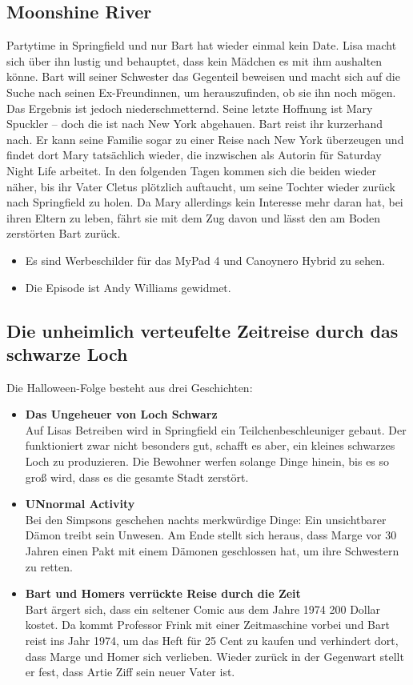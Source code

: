 \subsection{Moonshine River}
Partytime in Springfield und nur Bart hat wieder einmal kein Date. Lisa macht sich über ihn lustig und behauptet, dass kein Mädchen es mit ihm aushalten könne. Bart will seiner Schwester das Gegenteil beweisen und macht sich auf die Suche nach seinen Ex-Freundinnen, um herauszufinden, ob sie ihn noch mögen. Das Ergebnis ist jedoch niederschmetternd. Seine letzte Hoffnung ist Mary Spuckler -- doch die ist nach New York abgehauen. Bart reist ihr kurzerhand nach.  Er kann seine Familie sogar zu einer Reise nach New York überzeugen und findet dort Mary tatsächlich wieder, die inzwischen als Autorin für Saturday Night Life arbeitet. In den folgenden Tagen kommen sich die beiden wieder näher, bis ihr Vater Cletus plötzlich auftaucht, um seine Tochter wieder zurück nach Springfield zu holen. Da Mary allerdings kein Interesse mehr daran hat, bei ihren Eltern zu leben, fährt sie mit dem Zug davon und lässt den am Boden zerstörten Bart zurück.

\begin{itemize}
  \item Es sind Werbeschilder für das MyPad 4 und Canoynero Hybrid zu sehen.
	\item Die Episode ist Andy Williams gewidmet.
\end{itemize}

\subsection{Die unheimlich verteufelte Zeitreise durch das schwarze Loch}
Die Halloween-Folge besteht aus drei Geschichten:
\begin{itemize}
	\item \textbf{Das Ungeheuer von Loch Schwarz}\\ Auf Lisas Betreiben wird in Springfield ein Teilchenbeschleuniger gebaut. Der funktioniert zwar nicht besonders gut, schafft es aber, ein kleines schwarzes Loch zu produzieren. Die Bewohner werfen solange Dinge hinein, bis es so groß wird, dass es die gesamte Stadt zerstört.
	\item \textbf{UNnormal Activity}\\ Bei den Simpsons geschehen nachts merkwürdige Dinge: Ein unsichtbarer Dämon treibt sein Unwesen. Am Ende stellt sich heraus, dass Marge vor 30 Jahren einen Pakt mit einem Dämonen geschlossen hat, um ihre Schwestern zu retten.
	\item \textbf{Bart und Homers verrückte Reise durch die Zeit}\\ Bart ärgert sich, dass ein seltener Comic aus dem Jahre 1974 200 Dollar kostet. Da kommt Professor Frink mit einer Zeitmaschine vorbei und Bart reist ins Jahr 1974, um das Heft für 25 Cent zu kaufen und verhindert dort, dass Marge und Homer sich verlieben. Wieder zurück in der Gegenwart stellt er fest, dass Artie Ziff sein neuer Vater ist. 
\end{itemize}


